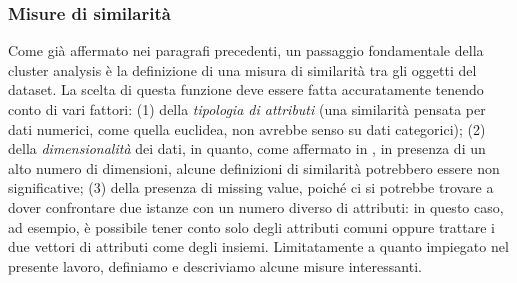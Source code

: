 \subsubsection{Misure di similarit\`a}
Come gi\`a affermato nei paragrafi precedenti, un passaggio fondamentale della cluster analysis \`e la definizione di una misura di similarit\`a tra gli oggetti del dataset. La scelta di questa funzione deve essere fatta accuratamente tenendo conto di vari fattori: (1) della \textit{tipologia di attributi} (una similarit\`a pensata per dati numerici, come quella euclidea, non avrebbe senso su dati categorici); (2) della \textit{dimensionalit\`a} dei dati, in quanto, come affermato in \cite{Aggarwal01}, in presenza di un alto numero di dimensioni, alcune definizioni di similarit\`a potrebbero essere non significative; (3) della presenza di missing value, poich\'e ci si potrebbe trovare a dover confrontare due istanze con un numero diverso di attributi: in questo caso, ad esempio, \`e possibile tener conto solo degli attributi comuni oppure trattare i due vettori di attributi come degli insiemi. Limitatamente a quanto impiegato nel presente lavoro, definiamo e descriviamo alcune misure interessanti.

